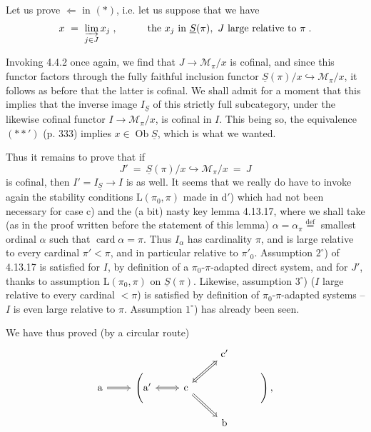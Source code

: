 \documentclass[11pt]{article}
\newcommand{\printedpage}[1]{\marginpar{\footnotesize p.~#1}}
\newcommand{\msp}[1]{\marginpar{\footnotesize [#1]}}
\DeclareMathOperator{\card}{card}
\DeclareMathOperator{\Ob}{Ob}
\begin{document}
Let us prove $\Longleftarrow$ in $(*)$, i.e. let us suppose that we have
\[
x \ = \ \varinjlim_{j\in J} x_j \; , \qquad\quad \text{the } x_j \text{ in } \underline{S}(\pi),\ J \text{ large relative to } \pi \; .
\]

\printedpage{127}

\msp{page 335}

Invoking 4.4.2 once again, we find that $J \longrightarrow \mathcal{M}_\pi/x$ is cofinal, and since this functor factors through the fully faithful inclusion functor $\underline{S}(\pi)/x \hookrightarrow \mathcal{M}_\pi/x$, it follows as before that the latter is cofinal. We shall admit for a moment that this implies that the inverse image $I_{\underline{S}}$ of this strictly full subcategory, under the likewise cofinal functor $I \longrightarrow \mathcal{M}_\pi/x$, is cofinal in $I$. This being so, the equivalence $(**')$ (p. 333) implies $x \in \Ob\underline{S}$, which is what we wanted.

Thus it remains to prove that if
\[
J' \ = \ \underline{S}(\pi)/x \hookrightarrow \mathcal{M}_\pi/x \ = \ J
\]
is cofinal, then $I' = I_{\underline{S}} \longrightarrow I$ is as well. It seems that we really do have to invoke again the stability conditions $\mathrm{L}(\pi_0,\pi)$ made in d$'$) which had not been necessary for case c) and
\msp{page 336}
the (a bit) nasty key lemma 4.13.17, where we shall take (as in the proof written
before the statement of this lemma) %
$\alpha = \alpha_\pi \overset{\text{def}}{=}$ smallest ordinal $\alpha$ such that $\card\alpha = \pi$. Thus $I_\alpha$ has cardinality $\pi$, and is large relative to every cardinal $\pi' < \pi$, and in particular relative to $\pi'_0$. Assumption $2^\circ$) of 4.13.17 is satisfied for $I$, by definition of a $\pi_0$-$\pi$-adapted direct system, and for $J'$, thanks to assumption $\mathrm{L}(\pi_0,\pi)$ on $\underline{S}(\pi)$. Likewise, assumption $3^\circ$) ($I$ large relative to every cardinal $< \pi$) is satisfied by definition of $\pi_0$-$\pi$-adapted systems -- $I$ is even large relative to $\pi$. Assumption $1^\circ$) has already been seen.

We have thus proved (by a circular route)
\[
\begin{tikzcd}[row sep=small]
& & & \mathrm{c}' & \\
\mathrm{a} \arrow[r, Rightarrow] & \Bigg(\mathrm{a}' \arrow[r, Leftrightarrow] & \mathrm{c} \arrow[ur, Leftrightarrow] \arrow[dr, Rightarrow] & & \Bigg)\, , \\ %
& & & \mathrm{b} &
\end{tikzcd}
\]
\end{document}
